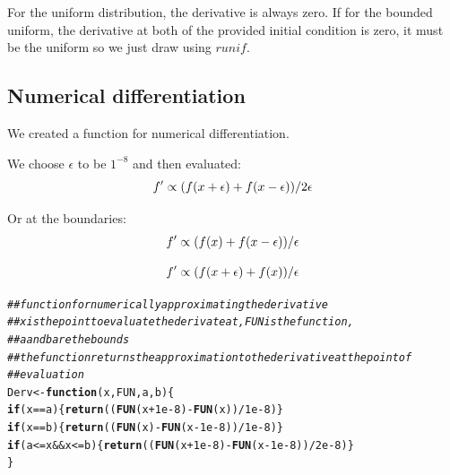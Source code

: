 \documentclass{article}\usepackage[]{graphicx}\usepackage[]{color}
\makeatletter
\newcommand{\hlnum}[1]{\textcolor[rgb]{0.686,0.059,0.569}{#1}}%
\newcommand{\hlcom}[1]{\textcolor[rgb]{0.678,0.584,0.686}{\textit{#1}}}%
\newcommand{\hlopt}[1]{\textcolor[rgb]{0,0,0}{#1}}%
\newcommand{\hlstd}[1]{\textcolor[rgb]{0.345,0.345,0.345}{#1}}%
\newcommand{\hlkwa}[1]{\textcolor[rgb]{0.161,0.373,0.58}{\textbf{#1}}}%
\newcommand{\hlkwb}[1]{\textcolor[rgb]{0.69,0.353,0.396}{#1}}%
\newcommand{\hlkwc}[1]{\textcolor[rgb]{0.333,0.667,0.333}{#1}}%
\newcommand{\hlkwd}[1]{\textcolor[rgb]{0.737,0.353,0.396}{\textbf{#1}}}%
\newenvironment{kframe}{%
 \def\at@end@of@kframe{}%
 \ifinner\ifhmode%
  \def\at@end@of@kframe{\end{minipage}}%
  \begin{minipage}{\columnwidth}%
 \fi\fi%
 \def\FrameCommand##1{\hskip\@totalleftmargin \hskip-\fboxsep
 \colorbox{shadecolor}{##1}\hskip-\fboxsep
     \hskip-\linewidth \hskip-\@totalleftmargin \hskip\columnwidth}%
 \MakeFramed {\advance\hsize-\width
   \@totalleftmargin\z@ \linewidth\hsize
   \@setminipage}}%
 {\par\unskip\endMakeFramed%
 \at@end@of@kframe}
\newenvironment{knitrout}{}{} %
\makeatother
\begin{document}
For the uniform distribution, the derivative is always zero. If for the
bounded uniform, the derivative at both of the provided initial
condition is zero, it must be the uniform so we just draw using $runif$.

\subsection{Numerical differentiation}

We created a function for numerical differentiation. 

We choose $\epsilon$ to be $1^{-8}$ and then evaluated:
\begin{equation}
\label{eq:deriv}
f' \propto (f(x+\epsilon) + f(x-\epsilon))/2\epsilon  \\
\end{equation}

Or at the boundaries:
\begin{equation}
\label{eq:deriv}
f' \propto (f(x) + f(x-\epsilon))/\epsilon  \\ 
\end{equation}

\begin{equation}
\label{eq:deriv}
f' \propto (f(x+\epsilon) + f(x))/\epsilon  \\ 
\end{equation}

\begin{knitrout}
\color{fgcolor}\begin{kframe}
\begin{alltt}
\hlcom{## function for numerically approximating the derivative}
\hlcom{## x is the point to evaluate the derivate at, FUN is the function,}
\hlcom{## a and b are the bounds}
\hlcom{## the function returns the approximation to the derivative at the point of}
\hlcom{## evaluation}
\hlstd{Derv} \hlkwb{<-} \hlkwa{function}\hlstd{(}\hlkwc{x}\hlstd{,} \hlkwc{FUN}\hlstd{,} \hlkwc{a}\hlstd{,} \hlkwc{b}\hlstd{)\{}
  \hlkwa{if} \hlstd{(x} \hlopt{==} \hlstd{a) \{}\hlkwd{return} \hlstd{((}\hlkwd{FUN}\hlstd{(x} \hlopt{+} \hlnum{1e-8}\hlstd{)}\hlopt{-}\hlkwd{FUN}\hlstd{(x))}\hlopt{/}\hlnum{1e-8}\hlstd{)\}}
  \hlkwa{if} \hlstd{(x} \hlopt{==} \hlstd{b) \{}\hlkwd{return} \hlstd{((}\hlkwd{FUN}\hlstd{(x)} \hlopt{-} \hlkwd{FUN}\hlstd{(x} \hlopt{-} \hlnum{1e-8}\hlstd{))}\hlopt{/}\hlnum{1e-8}\hlstd{)\}}
  \hlkwa{if} \hlstd{(a} \hlopt{<=} \hlstd{x} \hlopt{&&} \hlstd{x} \hlopt{<=} \hlstd{b) \{}\hlkwd{return}\hlstd{((}\hlkwd{FUN}\hlstd{(x} \hlopt{+} \hlnum{1e-8}\hlstd{)}\hlopt{-}\hlkwd{FUN}\hlstd{(x} \hlopt{-} \hlnum{1e-8}\hlstd{))}\hlopt{/}\hlnum{2e-8}\hlstd{)\}}
\hlstd{\}}
\end{alltt}
\end{kframe}
\end{knitrout}
\end{document}

